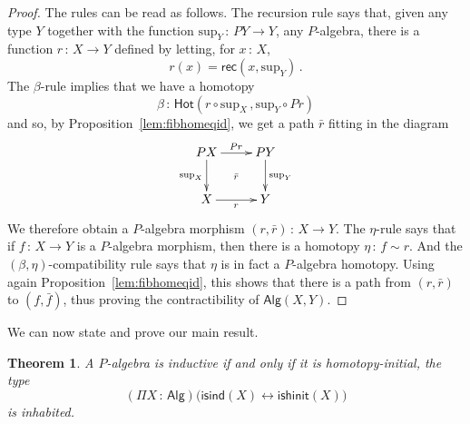 \documentclass[10pt,a4paper,oneside,reqno]{amsart}
\theoremstyle{mythm}
\newtheorem{theorem}{Theorem}[section]
\theoremstyle{mydef}
\theoremstyle{myrmk}
\newcommand{\ie}{\text{i.e.\ }}
\newcommand{\co}{\,{:}\,}
\newcommand{\isalgind}{\mathsf{isind}}
\newcommand{\isalghinit}{\mathsf{ishinit}}
\newcommand{\Hot}{\mathsf{Hot}}
\newcommand{\rec}{\mathsf{rec}}
\newcommand{\Palg}{\mathsf{Alg}}
\renewcommand{\sup}{\mathrm{sup}}
\begin{document}
\begin{proof} The rules can be read as follows. The recursion rule says that, given any type $Y$ together 
with the function $\sup_Y \co PY \to Y$, \ie any $P$-algebra, there is a function $r \co X \to Y$
defined by letting,  for $x \co X$, 
\[
r(x) = \rec(x, \sup_Y) \, .
\]
The $\beta$-rule implies that we have a homotopy 
\[
\beta \co \Hot( r \circ \sup_X \, , \sup_Y \circ Pr)
\]
and so, by Proposition~\ref{lem:fibhomeqid}, we get a path $\bar{r}$ fitting in the diagram
\[
\xymatrix{
PX \ar[d]_{\sup_X} \ar[r]^{Pr} \ar@{}[dr]|{\bar{r}} & PY \ar[d]^{\sup_Y} \\
X \ar[r]_r & Y}
\]
We therefore obtain a $P$-algebra morphism  $(r, \bar{r}) \co X \to Y$.  The 
$\eta$-rule says that if $f \co X \to Y$ is a $P$-algebra morphism, then there is a homotopy $\eta \co f \sim r$.  
And the $(\beta,\eta)$-compatibility rule says that $\eta$ is in fact a $P$-algebra homotopy. Using again 
Proposition~\ref{lem:fibhomeqid}, this shows that there is a path from $(r, \bar{r})$ to $(f, \bar{f})$, thus
proving the contractibility of $\Palg(X,Y)$.
\end{proof}



We can now state and prove our main result. 

\begin{theorem}\label{thm:WMain} A $P$-algebra is inductive if and only if
it is homotopy-initial, \ie the type
\[ 
(\Pi X \co \Palg) \big( \isalgind(X) \leftrightarrow \isalghinit(X) \big)
\]
is inhabited. 
\end{theorem}
\end{document}

